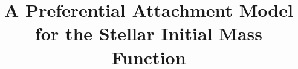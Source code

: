 \documentclass[ejs]{imsart}
\numberwithin{equation}{section}
\theoremstyle{plain}
\begin{document}
\begin{frontmatter}
\title{A Preferential Attachment Model for the Stellar Initial Mass Function}

\begin{aug}
\author{ %
}
\address{Department of Statistics \& Data Science \\
Yale University \\
New Haven, CT 06511\\
}

\author{ }
\address{Savvysherpa \\
Minneapolis, MN 55430 \\
}

\author{ 
}
\address{Department of Statistics and Data Science\\
Carnegie Mellon University \\
Pittsburgh, PA, 15213 \\
\\
}

\author{ 
}
\address{Center for Cosmology and Particle Physics \\
Department of Physics \\
New York University \\
New York, NY 10003 \\
\\
}



\end{aug}


\end{frontmatter}
\end{document}
